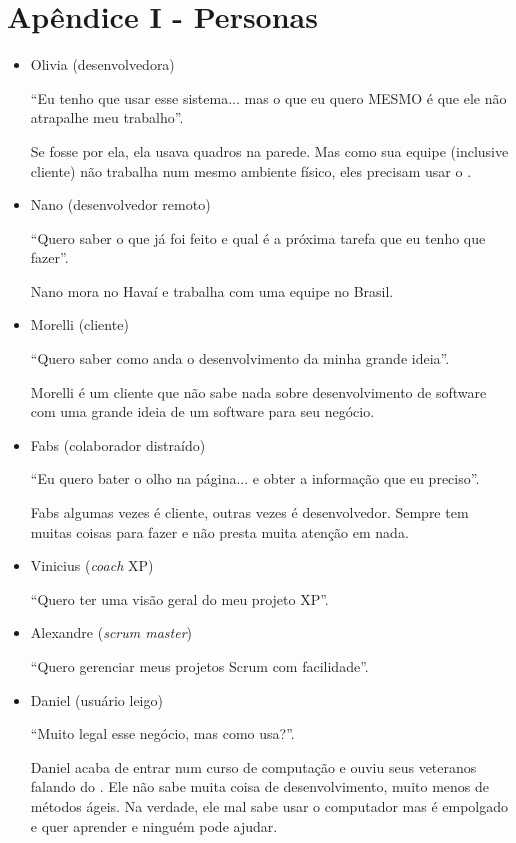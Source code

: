 \section{Apêndice I - Personas}
\label{sec:personas}

\begin{itemize}
	\item{Olivia (desenvolvedora)
	
	``Eu tenho que usar esse sistema... mas o que eu quero MESMO é que ele não atrapalhe meu
	trabalho''.
	
	Se fosse por ela, ela usava quadros na parede. Mas como sua equipe (inclusive cliente) não trabalha num mesmo ambiente físico, eles precisam usar o \calopsita.}
	\item{Nano (desenvolvedor remoto)
	
	``Quero saber o que já foi feito e qual é a próxima tarefa que eu tenho que fazer''.
	
	Nano mora no Havaí e trabalha com uma equipe no Brasil.}
	\item{Morelli (cliente)
	
	``Quero saber como anda o desenvolvimento da minha grande ideia''. 
	
	Morelli é um cliente que não sabe nada sobre desenvolvimento de software com uma grande ideia de um software para seu negócio.}
	\item{Fabs (colaborador distraído)
	
	``Eu quero bater o olho na página... e obter a informação que eu preciso''.
	
	Fabs algumas vezes é cliente, outras vezes é desenvolvedor. Sempre tem muitas coisas para fazer e não presta muita atenção em nada.}
	\item{Vinicius (\textit{coach} XP)
	
	``Quero ter uma visão geral do meu projeto XP''.}
	\item{Alexandre (\textit{scrum master})
	
	``Quero gerenciar meus projetos Scrum com facilidade''.}
	\item{Daniel (usuário leigo)
	
	``Muito legal esse negócio, mas como usa?''. 
	
	Daniel acaba de entrar num curso de computação e ouviu seus veteranos falando do \calopsita{}. Ele não sabe muita coisa de desenvolvimento, muito menos de métodos ágeis. Na verdade, ele mal sabe usar o computador mas é empolgado e quer aprender e ninguém pode ajudar.}
\end{itemize}
